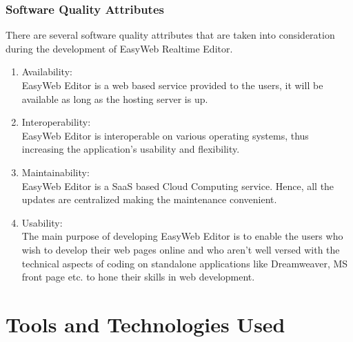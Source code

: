 \documentclass[12pt,a4paper]{article}
\begin{document}
\subsubsection{Software Quality Attributes}
There are several software quality attributes that are taken into consideration during the development of EasyWeb Realtime Editor.
\begin{enumerate}
\item Availability:\\EasyWeb Editor is a web based service provided to the users, it will be available as long as the hosting server is up.
\item Interoperability:\\EasyWeb Editor is interoperable on various operating systems, thus increasing the application's usability and flexibility.
\item Maintainability: \\ EasyWeb Editor is a SaaS based Cloud Computing service. Hence, all the updates are centralized making the maintenance convenient.
\item Usability:\\The main purpose of developing EasyWeb Editor is to enable the users who wish to develop their web pages online and who aren't well versed with the technical aspects of coding on standalone applications like Dreamweaver, MS front page etc. to hone their skills in web development.
\end{enumerate}
\newpage

\section{Tools and Technologies Used}
\end{document}
